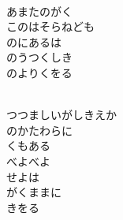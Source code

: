 \documentclass[10pt,b5j]{tarticle} %
\begin{document}
\begin{enumerate}
\begin{minipage}[c]{\blocksize}
        \vspace{\linespace}
        \item~\\
        あまたのがく\\
        このはそらねども\\
        のにあるは\\
        のうつくしき\\
        のよりくをる
        
        \vspace{\linespace}
        \item~\\
        つつましいがしきえか\\
        のかたわらに\\
        くもある\\
        べよべよ\\
        せよは\\
        がくままに\\
        きをる
    
    \end{minipage}
\end{enumerate} %
\end{document}
